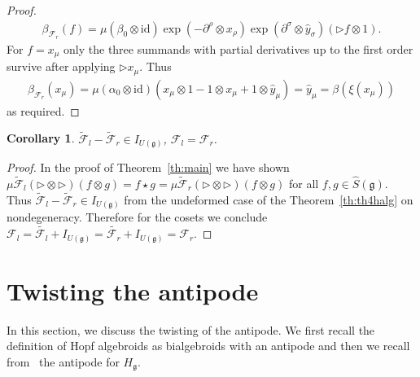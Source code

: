 \documentclass[10pt,a4paper]{amsart}
\def\gg{\mathfrak{g}}
\def\hy{\hat{y}}
\def\id{\mathrm{id}}
\newtheorem{Corollary}[Theorem]{Corollary}
\numberwithin{equation}{section}
\begin{document}
\begin{proof}
\begin{gather*}
\beta_{\mathcal{F}_r}(f)=\mu(\beta_0\otimes\id)\exp(-\partial^\rho\otimes x_\rho)\exp(\partial^\sigma\otimes\hy_\sigma)(\triangleright f\otimes 1).
\end{gather*}
For $f = x_\mu$ only the three summands with partial derivatives up to the first order survive after applying $\triangleright x_\mu$. Thus
\begin{gather*}
\beta_{\mathcal{F}_r}(x_\mu) = \mu(\alpha_0\otimes\id)(x_\mu\otimes 1 - 1\otimes x_\mu+1\otimes\hy_\mu) = \hy_\mu = \beta(\xi(x_\mu))
\end{gather*}
as required.
\end{proof}


\begin{Corollary} $\tilde{\mathcal{F}}_l - \tilde{\mathcal{F}}_r \in I_{U(\gg)}$, $\mathcal{F}_l = \mathcal{F}_r$.
\end{Corollary}
\begin{proof} In the proof of Theorem~\ref{th:main} we have shown $\mu\tilde{\mathcal{F}}_l(\triangleright\otimes\triangleright)(f\otimes g)
= f\star g = \mu\tilde{\mathcal{F}}_r(\triangleright\otimes\triangleright)(f\otimes g)$ for all $f,g\in\hat{S}(\gg)$. Thus $\tilde{\mathcal{F}}_l -\tilde{\mathcal{F}}_r\in I_{U(\gg)}$ from the undeformed case of the Theorem~\ref{th:th4halg} on nondegeneracy. Therefore for the cosets we conclude $\mathcal{F}_l = \tilde{\mathcal{F}_l}+I_{U(\gg)} = \tilde{\mathcal{F}_r} + I_{U(\gg)} =\mathcal{F}_r$.
\end{proof}

\section{Twisting the antipode}\label{sec:antipode}

In this section, we discuss the twisting of the antipode. We first recall the definition of Hopf algebroids as bialgebroids with an antipode and then we recall from~\cite{halg} the antipode for $H_\gg$.
\end{document}
